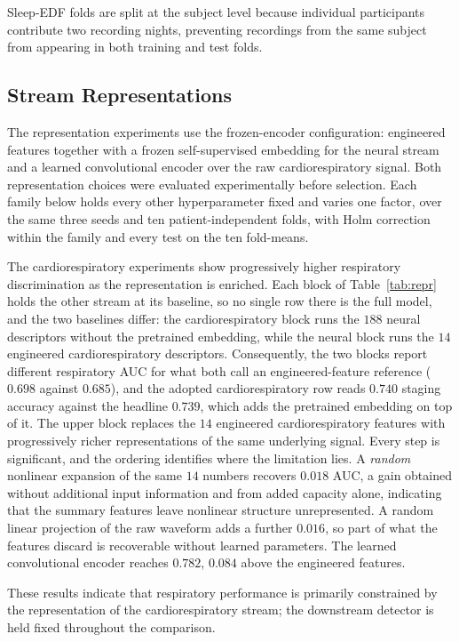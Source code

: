 \documentclass[a4paper,fleqn]{cas-sc}
\newcommand{\fzAcc}{0.739}
\begin{document}
Sleep-EDF folds are split at the subject level because individual participants
contribute two recording nights, preventing recordings from the same subject
from appearing in both training and test folds.



\subsection{Stream Representations}
\label{sec:repr}
The representation experiments use the frozen-encoder configuration: engineered features together with a frozen self-supervised embedding for the neural stream and a learned convolutional encoder over the raw cardiorespiratory signal. Both representation choices were evaluated experimentally before selection. Each family below holds every other hyperparameter fixed and varies one factor, over the same three seeds and ten patient-independent folds, with Holm correction within the family and every test on the ten fold-means.

The cardiorespiratory experiments show progressively higher respiratory discrimination as the representation is enriched. Each block of Table~\ref{tab:repr} holds the other stream at its baseline, so no single
row there is the full model, and the two baselines differ: the cardiorespiratory block runs
the $188$ neural descriptors without the pretrained embedding, while the neural block runs the
$14$ engineered cardiorespiratory descriptors. Consequently, the two blocks report different respiratory AUC for what both call an engineered-feature reference ($0.698$ against $0.685$), and the adopted cardiorespiratory row reads $0.740$ staging accuracy against the headline $\fzAcc$, which adds the pretrained embedding on top of it. The upper block replaces the $14$ engineered cardiorespiratory features
with progressively richer representations of the same underlying signal. Every step is
significant, and the ordering identifies where the limitation lies. A \emph{random} nonlinear expansion of the same $14$ numbers recovers $0.018$ AUC, a gain obtained without additional input information and from added capacity alone, indicating that the summary features leave nonlinear structure unrepresented. A random linear projection of the raw waveform adds a further $0.016$, so part of what the features discard is recoverable without learned parameters. The learned
convolutional encoder reaches $0.782$, $0.084$ above the engineered features.

These results indicate that respiratory performance is primarily constrained by the representation of the cardiorespiratory stream; the downstream detector is held fixed throughout the comparison.
\end{document}
